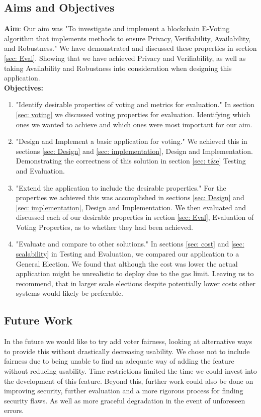 \documentclass{entcs}
\begin{document}
\subsection{Aims and Objectives}
{\bf Aim}: Our aim was "To investigate and implement a blockchain E-Voting algorithm that implements methods to ensure Privacy, Verifiability, Availability, and Robustness." We have demonstrated and discussed these properties in section \ref{sec: Eval}. Showing that we have achieved Privacy and Verifiability, as well as taking Availability and Robustness into consideration when designing this application.\\
{\bf Objectives:}
\begin{enumerate}
    \item "Identify desirable properties of voting and metrics for evaluation." In section \ref{sec: voting} we discussed voting properties for evaluation. Identifying which ones we wanted to achieve and which ones were most important for our aim.
    \item "Design and Implement a basic application for voting." We achieved this in sections \ref{sec: Design} and \ref{sec: implementation}, Design and Implementation. Demonstrating the correctness of this solution in section \ref{sec: t&e} Testing and Evaluation.
    \item "Extend the application to include the desirable properties." For the properties we achieved this was accomplished in sections \ref{sec: Design} and \ref{sec: implementation}, Design and Implementation. We then evaluated and discussed each of our desirable properties in section \ref{sec: Eval}, Evaluation of Voting Properties, as to whether they had been achieved.
    \item "Evaluate and compare to other solutions." In sections \ref{sec: cost} and \ref{sec: scalability} in Testing and Evaluation, we compared our application to a General Election. We found that although the cost was lower the actual application might be unrealistic to deploy due to the gas limit. Leaving us to recommend, that in larger scale elections despite potentially lower costs other systems would likely be preferable.
\end{enumerate}

\subsection{Future Work}
In the future we would like to try add voter fairness, looking at alternative ways to provide this without drastically decreasing usability. We chose not to include fairness due to being unable to find an adequate way of adding the feature without reducing usability. Time restrictions limited the time we could invest into the development of this feature. Beyond this, further work could also be done on improving security, further evaluation and a more rigorous process for finding security flaws. As well as more graceful degradation in the event of unforeseen errors.
\end{document}
